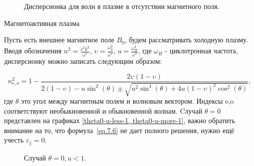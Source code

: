 \documentclass[10pt, a4paper]{article}
\begin{document}
\begin{figure}[h!]
    \caption{\label{plot.7.1} Дисперсионка для волн в плазме в отсутствии магнитного поля.}
\end{figure}

Магнитоактивная плазма

Пусть есть внешнее магнитное поле $B_0$, будем рассматривать холодную плазму. Вводя обозначения $n^2=\frac{c^2 k^2}{\omega^2}$, $\upsilon=\frac{\omega_p^2}{\omega^2}$, $u=\frac{\omega_H^2}{\omega^2}$, где $\omega_H$ - циклотронная частота,
дисперсионку можно записать следующим образом:

\begin{equation}
    \label{eq.7.6}
    n_{e,o}^2=1-\frac{2\upsilon (1-\upsilon)}{2(1-\upsilon) - u \sin^2(\theta) \pm \sqrt{u^2 \sin^4(\theta) + 4u(1-\upsilon)^2 \cos^2(\theta)}}, 
\end{equation}
где $\theta$ это угол между магнитным полем и волновым вектором. Индексы e,o соответствуют необыкновенной и обыкновенной волнам.
Cлучай $\theta=0$ представлен на графиках \ref{theta0-u-less-1, theta0-u-more-1}, важно обратить внимание на то, что формула~\ref{eq.7.6} не дает полного решения, нужно ещё учесть $\varepsilon_{\parallel}=0$.

\begin{figure}[h!]
    \caption{\label{theta0-u-less-1} Случай $\theta=0, u < 1$.}
\end{figure}
\end{document}
